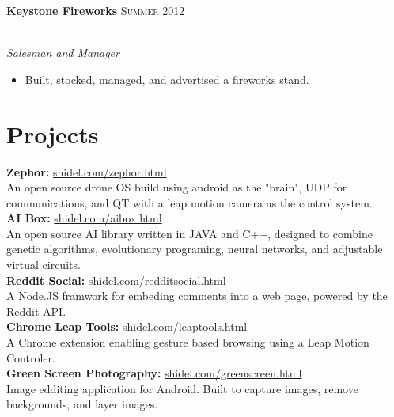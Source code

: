 \documentclass[10pt]{article}
\begin{document}
{\begin{minipage}[t]{0.5\textwidth}
\textbf{Keystone Fireworks} \hfill \textsc{Summer 2012}
{\raggedright\large\\
\textit{Salesman and Manager}\\[5pt]}
\vspace{-0.5 cm}
\begin{itemize}
  \setlength\itemsep{0em}
  \item[\ding{226}] Built, stocked, managed, and advertised a fireworks stand.
\end{itemize}

\section{Projects} 
\textbf{Zephor:} \hfill \href{http://shidel.com/zephor.html}{shidel.com/zephor.html}
\vspace{0.5 mm}\\
An open source drone OS build using android as the "brain", UDP for communications, and QT with a leap motion camera as the control system. \\

\textbf{AI Box:} \hfill \href{http://shidel.com/aibox.html}{shidel.com/aibox.html}
\vspace{0.5 mm}\\
An open source AI library written in JAVA and C++, designed to combine genetic algorithms, evolutionary programing, neural networks, and adjustable virtual circuits. \\

\textbf{Reddit Social:} \hfill \href{http://shidel.com/redditsocial.html}{shidel.com/redditsocial.html}
\vspace{0.5 mm}\\
A Node.JS framwork for embeding comments into a web page, powered by the Reddit API. \\

\textbf{Chrome Leap Tools:} \hfill \href{http://shidel.com/leaptools.html}{shidel.com/leaptools.html}
\vspace{0.5 mm}\\
A Chrome extension enabling gesture based browsing using a Leap Motion Controler.\\

\textbf{Green Screen Photography:} \hfill \href{http://shidel.com/greenscreen.html}{shidel.com/greenscreen.html}
\vspace{0.5 mm}\\
Image edditing application for Android. Built to capture images, remove backgrounds, and
layer images. \\


\end{minipage}}
\end{document}
